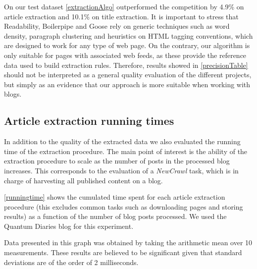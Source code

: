 \precisionTable

On our test dataset \autoref{extractionAlgo} outperformed the competition by 4.9\% on article extraction and 10.1\% on title extraction. It is important to stress that Readability, Boilerpipe and Goose rely on generic techniques such as word density, paragraph clustering and heuristics on HTML tagging conventions, which are designed to work for any type of web page. On the contrary, our algorithm is only suitable for pages with associated web feeds, as these provide the reference data used to build extraction rules. Therefore, results showed in \autoref{precisionTable} should not be interpreted as a general quality evaluation of the different projects, but simply as an evidence that our approach is more suitable when working with blogs.


\subsection{Article extraction running times}

In addition to the quality of the extracted data we also evaluated the running time of the extraction procedure. The main point of interest is the ability of the extraction procedure to scale as the number of posts in the processed blog increases. This corresponds to the evaluation of a \emph{NewCrawl} task, which is in charge of harvesting all published content on a blog.

\autoref{runningtime} shows the cumulated time spent for each article extraction procedure (this excludes common tasks such as downloading pages and storing results) as a function of the number of blog posts processed. We used the Quantum Diaries \cite{quantumdiaries} blog for this experiment.

Data presented in this graph was obtained by taking the arithmetic mean over 10 measurements. These results are believed to be significant given that standard deviations are of the order of 2 milliseconds.




